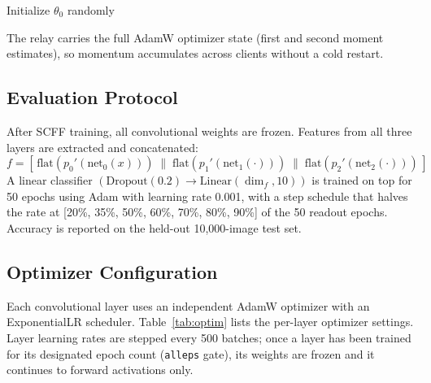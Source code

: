 \documentclass[12pt]{article}
\begin{document}
\begin{algorithm}[H]
  \caption{SCFF Multi-Client Sequential Relay}
  \label{alg:multi}

  Initialize $\theta_0$ randomly\;
\end{algorithm}

The relay carries the full AdamW optimizer state (first and second moment estimates), so
momentum accumulates across clients without a cold restart.

\subsection{Evaluation Protocol}

After SCFF training, all convolutional weights are frozen. Features from all three layers are
extracted and concatenated:
\begin{equation}
  f = \left[\,\text{flat}\!\left(p_0'(\text{net}_0(x))\right) \;\big\|\;
             \text{flat}\!\left(p_1'(\text{net}_1(\cdot))\right) \;\big\|\;
             \text{flat}\!\left(p_2'(\text{net}_2(\cdot))\right)\,\right]
\end{equation}
A linear classifier $(\text{Dropout}(0.2) \to \text{Linear}(\dim_f, 10))$ is trained on top for
50 epochs using Adam with learning rate 0.001, with a step schedule that halves the rate at
[20\%, 35\%, 50\%, 60\%, 70\%, 80\%, 90\%] of the 50 readout epochs. Accuracy is reported on
the held-out 10,000-image test set.

\subsection{Optimizer Configuration}

Each convolutional layer uses an independent AdamW optimizer with an ExponentialLR scheduler.
Table~\ref{tab:optim} lists the per-layer optimizer settings. Layer learning rates are stepped
every 500 batches; once a layer has been trained for its designated epoch count (\texttt{alleps}
gate), its weights are frozen and it continues to forward activations only.
\end{document}
